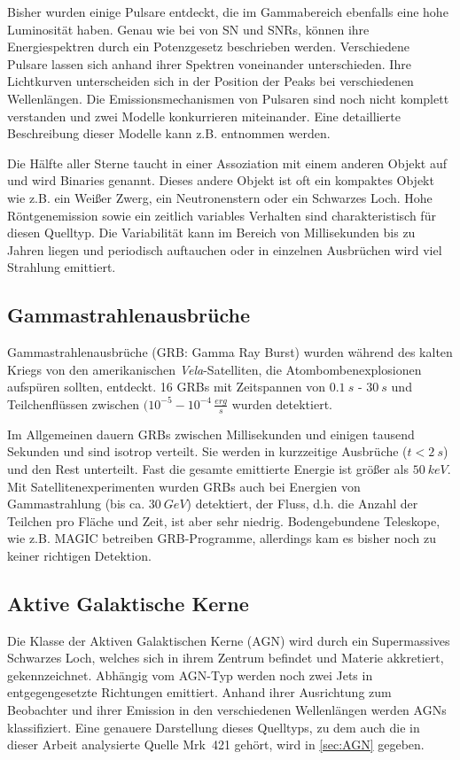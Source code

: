 Bisher wurden einige Pulsare entdeckt, die im Gammabereich ebenfalls eine hohe Luminosität haben.
Genau wie bei von SN und SNRs, können ihre Energiespektren durch ein Potenzgesetz beschrieben werden.
Verschiedene Pulsare lassen sich anhand ihrer Spektren voneinander unterschieden.
Ihre Lichtkurven unterscheiden sich in der Position der Peaks bei verschiedenen Wellenlängen.
Die Emissionsmechanismen von Pulsaren sind noch nicht komplett verstanden und zwei Modelle konkurrieren miteinander.
Eine detaillierte Beschreibung dieser Modelle kann z.B. \cite{Weekes} entnommen werden.

Die Hälfte aller Sterne taucht in einer Assoziation mit einem anderen Objekt auf und wird Binaries genannt.
Dieses andere Objekt ist oft ein kompaktes Objekt wie z.B. ein Weißer Zwerg, ein Neutronenstern oder ein Schwarzes Loch.
Hohe Röntgenemission sowie ein zeitlich variables Verhalten sind charakteristisch für diesen Quelltyp.
Die Variabilität kann im Bereich von Millisekunden bis zu Jahren liegen und periodisch auftauchen oder in einzelnen Ausbrüchen wird viel Strahlung emittiert.\cite{Weekes}


\subsection{Gammastrahlenausbrüche}
Gammastrahlenausbrüche (GRB: Gamma Ray Burst) wurden während des kalten Kriegs von den amerikanischen \textit{Vela}-Satelliten, die Atombombenexplosionen aufspüren sollten, entdeckt.
16 GRBs mit Zeitspannen von $\SI{0,1}{s}$ - $\SI{30}{s}$ und Teilchenflüssen zwischen $(10^{-5}-10^{-4}\,\frac{\si{erg}}{\si{s}}$ wurden detektiert.

Im Allgemeinen dauern GRBs zwischen Millisekunden und einigen tausend Sekunden und sind isotrop verteilt.
Sie werden in kurzzeitige Ausbrüche ($t<\SI{2}{s}$) und den Rest unterteilt.
Fast die gesamte emittierte Energie ist größer als $\SI{50}{keV}$.
Mit Satellitenexperimenten wurden GRBs auch bei Energien von Gammastrahlung (bis ca. $\SI{30}{GeV}$) detektiert, der Fluss, d.h. die Anzahl der Teilchen pro Fläche und Zeit, ist aber sehr niedrig.
Bodengebundene Teleskope, wie z.B. MAGIC betreiben GRB-Programme, allerdings kam es bisher noch zu keiner richtigen Detektion.\cite{Weekes}


\subsection{Aktive Galaktische Kerne}
Die Klasse der Aktiven Galaktischen Kerne (AGN) wird durch ein Supermassives Schwarzes Loch, welches sich in ihrem Zentrum befindet und Materie akkretiert, gekennzeichnet.
Abhängig vom AGN-Typ werden noch zwei Jets in entgegengesetzte Richtungen emittiert.  
Anhand ihrer Ausrichtung zum Beobachter und ihrer Emission in den verschiedenen Wellenlängen werden AGNs klassifiziert. 
Eine genauere Darstellung dieses Quelltyps, zu dem auch die in dieser Arbeit analysierte Quelle Mrk~421 gehört, wird in \autoref{sec:AGN} gegeben.

